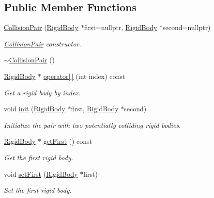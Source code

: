 \subsection*{Public Member Functions}
\begin{DoxyCompactItemize}
\item 
\mbox{\hyperlink{classr3_1_1_collision_pair_ab6434bde3aa02c2655e26a976570db01}{Collision\+Pair}} (\mbox{\hyperlink{classr3_1_1_rigid_body}{Rigid\+Body}} $\ast$first=nullptr, \mbox{\hyperlink{classr3_1_1_rigid_body}{Rigid\+Body}} $\ast$second=nullptr)
\begin{DoxyCompactList}\small\item\em \mbox{\hyperlink{classr3_1_1_collision_pair}{Collision\+Pair}} constructor. \end{DoxyCompactList}\item 
\mbox{\hyperlink{classr3_1_1_collision_pair_a38ae2cf6732b5a1b4dfdc544bbff82e0}{$\sim$\+Collision\+Pair}} ()
\item 
\mbox{\hyperlink{classr3_1_1_rigid_body}{Rigid\+Body}} $\ast$ \mbox{\hyperlink{classr3_1_1_collision_pair_a8d56c936cb56821247c5b1a684578c0a}{operator\mbox{[}$\,$\mbox{]}}} (int index) const
\begin{DoxyCompactList}\small\item\em Get a rigid body by index. \end{DoxyCompactList}\item 
void \mbox{\hyperlink{classr3_1_1_collision_pair_a7e64e731162cfdc3222d8f02b7c886b1}{init}} (\mbox{\hyperlink{classr3_1_1_rigid_body}{Rigid\+Body}} $\ast$first, \mbox{\hyperlink{classr3_1_1_rigid_body}{Rigid\+Body}} $\ast$second)
\begin{DoxyCompactList}\small\item\em Initialize the pair with two potentially colliding rigid bodies. \end{DoxyCompactList}\item 
\mbox{\hyperlink{classr3_1_1_rigid_body}{Rigid\+Body}} $\ast$ \mbox{\hyperlink{classr3_1_1_collision_pair_a603f9437f7fa4aa5253ad26247ee75ae}{get\+First}} () const
\begin{DoxyCompactList}\small\item\em Get the first rigid body. \end{DoxyCompactList}\item 
void \mbox{\hyperlink{classr3_1_1_collision_pair_ac900e6382810b6820dc3f4ecf832bb6b}{set\+First}} (\mbox{\hyperlink{classr3_1_1_rigid_body}{Rigid\+Body}} $\ast$first)
\begin{DoxyCompactList}\small\item\em Set the first rigid body. \end{DoxyCompactList}\item 

\end{DoxyCompactItemize}
